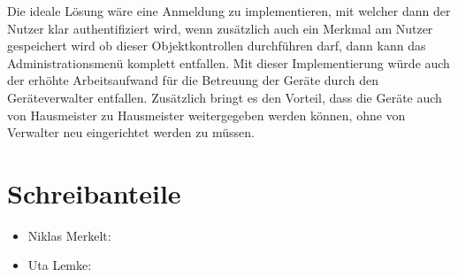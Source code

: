 \documentclass[12pt]{article}
\begin{document}
Die ideale Lösung wäre eine Anmeldung zu implementieren, mit welcher dann der Nutzer klar authentifiziert wird, wenn zusätzlich auch ein Merkmal am Nutzer gespeichert wird ob dieser Objektkontrollen durchführen darf, dann kann das Administrationsmenü komplett entfallen. Mit dieser Implementierung würde auch der erhöhte Arbeitsaufwand für die Betreuung der Geräte durch den Geräteverwalter entfallen. Zusätzlich bringt es den Vorteil, dass die Geräte auch von Hausmeister zu Hausmeister weitergegeben werden können, ohne von Verwalter neu eingerichtet werden zu müssen.

\section{Schreibanteile}
\begin{itemize}
	\item Niklas Merkelt:
	\item Uta Lemke:
\end{itemize}
\end{document}

